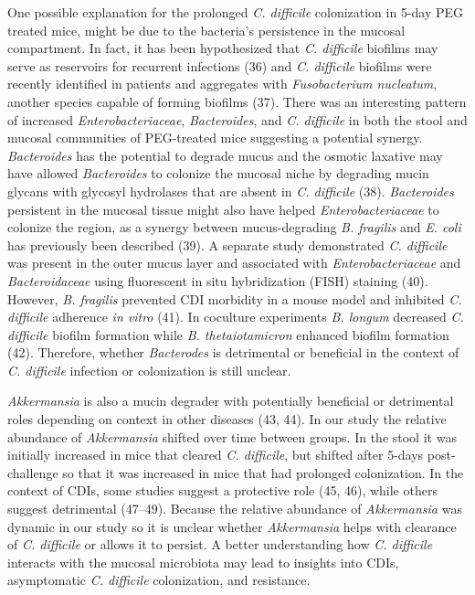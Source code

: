 \documentclass[
  11pt,
]{article}
\begin{document}
One possible explanation for the prolonged \emph{C. difficile}
colonization in 5-day PEG treated mice, might be due to the bacteria's
persistence in the mucosal compartment. In fact, it has been
hypothesized that \emph{C. difficile} biofilms may serve as reservoirs
for recurrent infections (36) and \emph{C. difficile} biofilms were
recently identified in patients and aggregates with \emph{Fusobacterium
nucleatum}, another species capable of forming biofilms (37). There was
an interesting pattern of increased \emph{Enterobacteriaceae},
\emph{Bacteroides}, and \emph{C. difficile} in both the stool and
mucosal communities of PEG-treated mice suggesting a potential synergy.
\emph{Bacteroides} has the potential to degrade mucus and the osmotic
laxative may have allowed \emph{Bacteroides} to colonize the mucosal
niche by degrading mucin glycans with glycosyl hydrolases that are
absent in \emph{C. difficile} (38). \emph{Bacteroides} persistent in the
mucosal tissue might also have helped \emph{Enterobacteriaceae} to
colonize the region, as a synergy between mucus-degrading \emph{B.
fragilis} and \emph{E. coli} has previously been described (39). A
separate study demonstrated \emph{C. difficile} was present in the outer
mucus layer and associated with \emph{Enterobacteriaceae} and
\emph{Bacteroidaceae} using fluorescent in situ hybridization (FISH)
staining (40). However, \emph{B. fragilis} prevented CDI morbidity in a
mouse model and inhibited \emph{C. difficile} adherence \emph{in vitro}
(41). In coculture experiments \emph{B. longum} decreased \emph{C.
difficile} biofilm formation while \emph{B. thetaiotamicron} enhanced
biofilm formation (42). Therefore, whether \emph{Bacterodes} is
detrimental or beneficial in the context of \emph{C. difficile}
infection or colonization is still unclear.

\emph{Akkermansia} is also a mucin degrader with potentially beneficial
or detrimental roles depending on context in other diseases (43, 44). In
our study the relative abundance of \emph{Akkermansia} shifted over time
between groups. In the stool it was initially increased in mice that
cleared \emph{C. difficile}, but shifted after 5-days post-challenge so
that it was increased in mice that had prolonged colonization. In the
context of CDIs, some studies suggest a protective role (45, 46), while
others suggest detrimental (47--49). Because the relative abundance of
\emph{Akkermansia} was dynamic in our study so it is unclear whether
\emph{Akkermansia} helps with clearance of \emph{C. difficile} or allows
it to persist. A better understanding how \emph{C. difficile} interacts
with the mucosal microbiota may lead to insights into CDIs, asymptomatic
\emph{C. difficile} colonization, and resistance.
\end{document}

